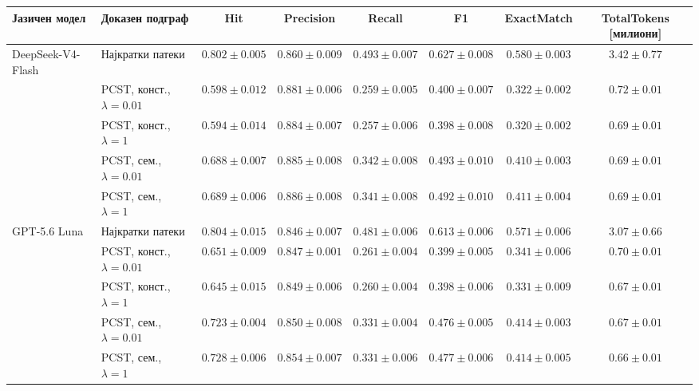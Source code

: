 \begin{tabular}{llcccccc}
\toprule
Јазичен модел & Доказен подграф & Hit & Precision & Recall & F1 & ExactMatch & TotalTokens [милиони] \\
\midrule
DeepSeek-V4-Flash & Најкратки патеки & $0.802 \pm 0.005$ & $0.860 \pm 0.009$ & {\boldmath $0.493 \pm 0.007$} & {\boldmath $0.627 \pm 0.008$} & {\boldmath $0.580 \pm 0.003$} & $3.42 \pm 0.77$ \\
 & PCST, конст., $\lambda=0.01$ & $0.598 \pm 0.012$ & $0.881 \pm 0.006$ & $0.259 \pm 0.005$ & $0.400 \pm 0.007$ & $0.322 \pm 0.002$ & $0.72 \pm 0.01$ \\
 & PCST, конст., $\lambda=1$ & $0.594 \pm 0.014$ & $0.884 \pm 0.007$ & $0.257 \pm 0.006$ & $0.398 \pm 0.008$ & $0.320 \pm 0.002$ & $0.69 \pm 0.01$ \\
 & PCST, сем., $\lambda=0.01$ & $0.688 \pm 0.007$ & $0.885 \pm 0.008$ & $0.342 \pm 0.008$ & $0.493 \pm 0.010$ & $0.410 \pm 0.003$ & $0.69 \pm 0.01$ \\
 & PCST, сем., $\lambda=1$ & $0.689 \pm 0.006$ & {\boldmath $0.886 \pm 0.008$} & $0.341 \pm 0.008$ & $0.492 \pm 0.010$ & $0.411 \pm 0.004$ & $0.69 \pm 0.01$ \\
\midrule
GPT-5.6 Luna & Најкратки патеки & {\boldmath $0.804 \pm 0.015$} & $0.846 \pm 0.007$ & $0.481 \pm 0.006$ & $0.613 \pm 0.006$ & $0.571 \pm 0.006$ & $3.07 \pm 0.66$ \\
 & PCST, конст., $\lambda=0.01$ & $0.651 \pm 0.009$ & $0.847 \pm 0.001$ & $0.261 \pm 0.004$ & $0.399 \pm 0.005$ & $0.341 \pm 0.006$ & $0.70 \pm 0.01$ \\
 & PCST, конст., $\lambda=1$ & $0.645 \pm 0.015$ & $0.849 \pm 0.006$ & $0.260 \pm 0.004$ & $0.398 \pm 0.006$ & $0.331 \pm 0.009$ & $0.67 \pm 0.01$ \\
 & PCST, сем., $\lambda=0.01$ & $0.723 \pm 0.004$ & $0.850 \pm 0.008$ & $0.331 \pm 0.004$ & $0.476 \pm 0.005$ & $0.414 \pm 0.003$ & $0.67 \pm 0.01$ \\
 & PCST, сем., $\lambda=1$ & $0.728 \pm 0.006$ & $0.854 \pm 0.007$ & $0.331 \pm 0.006$ & $0.477 \pm 0.006$ & $0.414 \pm 0.005$ & {\boldmath $0.66 \pm 0.01$} \\
\bottomrule
\end{tabular}
